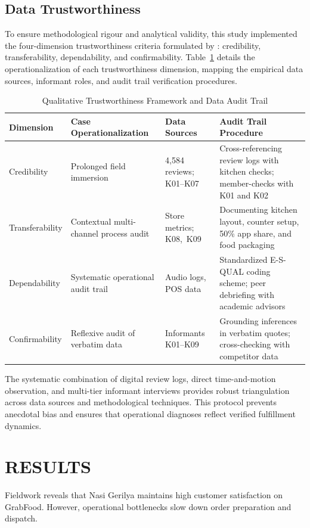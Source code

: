 \documentclass{jomas}
\begin{document}
\subsection{Data Trustworthiness}
To ensure methodological rigour and analytical validity, this study implemented the four-dimension trustworthiness criteria formulated by \textcite{lincoln1985naturalistic}: credibility, transferability, dependability, and confirmability. Table~\ref{tab:trustworthiness-audit} details the operationalization of each trustworthiness dimension, mapping the empirical data sources, informant roles, and audit trail verification procedures.

\begin{table}[H]
\caption{Qualitative Trustworthiness Framework and Data Audit Trail}
\label{tab:trustworthiness-audit}
\centering
\small
\setlength{\tabcolsep}{4.5pt}
\begin{tabularx}{\textwidth}{l p{4.0cm} p{2.6cm} X}
\toprule
\textbf{Dimension} & \textbf{Case Operationalization} & \textbf{Data Sources} & \textbf{Audit Trail Procedure} \\
\midrule
Credibility & Prolonged field immersion & 4,584 reviews; \mbox{K01--K07} & Cross-referencing review logs with kitchen checks; member-checks with K01 and K02 \\
Transferability & Contextual multi-channel process audit & Store metrics; \mbox{K08, K09} & Documenting kitchen layout, counter setup, 50\% app share, and food packaging \\
Dependability & Systematic operational audit trail & Audio logs, POS data & Standardized E-S-QUAL coding scheme; peer debriefing with academic advisors \\
Confirmability & Reflexive audit of verbatim data & Informants \mbox{K01--K09} & Grounding inferences in verbatim quotes; cross-checking with competitor data \\
\bottomrule
\end{tabularx}
\end{table}

The systematic combination of digital review logs, direct time-and-motion observation, and multi-tier informant interviews provides robust triangulation across data sources and methodological techniques. This protocol prevents anecdotal bias and ensures that operational diagnoses reflect verified fulfillment dynamics.

\section{RESULTS}
Fieldwork reveals that Nasi Gerilya maintains high customer satisfaction on GrabFood. However, operational bottlenecks slow down order preparation and dispatch.
\end{document}
